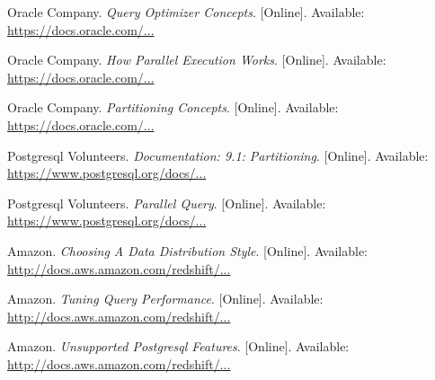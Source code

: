 \documentclass[draftclsnofoot, onecolumn, compsoc, 10pt]{IEEEtran}
\begin{document}
\begin{thebibliography}{9}
Oracle Company.
\textit{Query Optimizer Concepts}.
[Online].
Available: \href{https://docs.oracle.com/database/121/TGSQL/tgsql_optcncpt.htm#TGSQL192}{https://docs.oracle.com/...}
 
Oracle Company.
\textit{How Parallel Execution Works}.
[Online].
Available: \href{https://docs.oracle.com/cd/E11882_01/server.112/e25523/parallel002.htm}{https://docs.oracle.com/...}

Oracle Company.
\textit{Partitioning Concepts}.
[Online].
Available: \href{https://docs.oracle.com/cd/B28359_01/server.111/b32024/partition.htm}{https://docs.oracle.com/...}

Postgresql Volunteers.
\textit{Documentation: 9.1: Partitioning}.
[Online].
Available: \href{https://www.postgresql.org/docs/9.1/static/ddl-partitioning.html}{https://www.postgresql.org/docs/...}

Postgresql Volunteers.
\textit{Parallel Query}.
[Online].
Available: \href{https://www.postgresql.org/docs/current/static/parallel-query.html}{https://www.postgresql.org/docs/...}

Amazon.
\textit{Choosing A Data Distribution Style}.
[Online].
Available: \href{http://docs.aws.amazon.com/redshift/latest/dg/t_Distributing_data.html}{http://docs.aws.amazon.com/redshift/...}

Amazon.
\textit{Tuning Query Performance}.
[Online].
Available: \href{http://docs.aws.amazon.com/redshift/latest/dg/c-optimizing-query-performance.html}{http://docs.aws.amazon.com/redshift/...}

Amazon.
\textit{Unsupported Postgresql Features}.
[Online].
Available: \href{http://docs.aws.amazon.com/redshift/latest/dg/c_unsupported-postgresql-features.html}{http://docs.aws.amazon.com/redshift/...}
\end{thebibliography}
\end{document}

